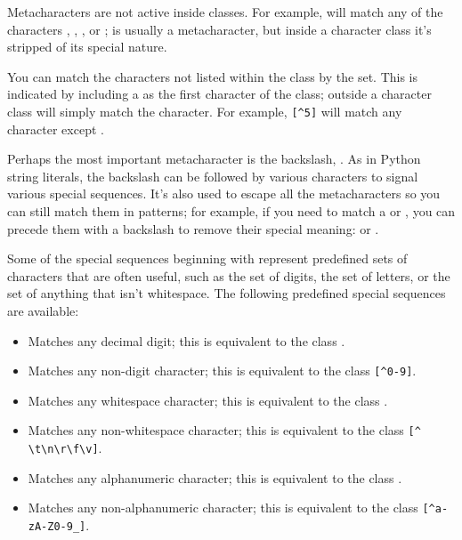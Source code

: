 \documentclass{howto}
\begin{document}
Metacharacters are not active inside classes.  For example,
\regexp{[akm\$]} will match any of the characters ,
, , or \character{\$}; \character{\$} is
usually a metacharacter, but inside a character class it's stripped of
its special nature.

You can match the characters not listed within the class by
 the set.  This is indicated by including a
\character{\^} as the first character of the class; \character{\^}
outside a character class will simply match the
\character{\^} character.  For example, \verb|[^5]| will match any
character except .

Perhaps the most important metacharacter is the backslash, \samp{\e}.  
As in Python string literals, the backslash can be followed by various
characters to signal various special sequences.  It's also used to escape
all the metacharacters so you can still match them in patterns; for
example, if you need to match a \samp{[} or 
\samp{\e}, you can precede them with a backslash to remove their
special meaning: \regexp{\e[} or \regexp{\e\e}.

Some of the special sequences beginning with \character{\e} represent
predefined sets of characters that are often useful, such as the set
of digits, the set of letters, or the set of anything that isn't
whitespace.  The following predefined special sequences are available:

\begin{itemize}
\item[\code{\e d}]Matches any decimal digit; this is
equivalent to the class \regexp{[0-9]}.

\item[\code{\e D}]Matches any non-digit character; this is
equivalent to the class \verb|[^0-9]|.

\item[\code{\e s}]Matches any whitespace character; this is
equivalent to the class \regexp{[ \e t\e n\e r\e f\e v]}.

\item[\code{\e S}]Matches any non-whitespace character; this is
equivalent to the class \verb|[^ \t\n\r\f\v]|.

\item[\code{\e w}]Matches any alphanumeric character; this is equivalent to the class
\regexp{[a-zA-Z0-9_]}.  

\item[\code{\e W}]Matches any non-alphanumeric character; this is equivalent to the class
\verb|[^a-zA-Z0-9_]|.   
\end{itemize}
\end{document}
